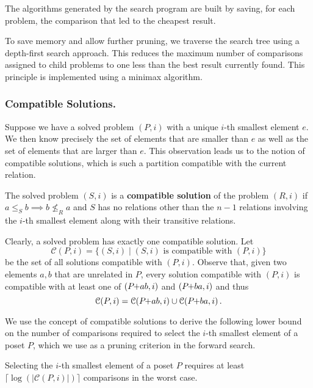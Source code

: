 \documentclass[a4paper,UKenglish,cleveref, autoref, thm-restate]{lipics-v2021}
\newcommand{\pchild}[3]{{#1}\kern-1pt{+}{#2}{#3}}
\begin{document}
The algorithms generated by the search program are built by saving, for each problem, the comparison that led to the cheapest result.

To save memory and allow further pruning, we traverse the search tree using a depth-first search approach.
This reduces the maximum number of comparisons assigned to child problems to one less than the best result currently found.
This principle is implemented using a minimax algorithm.

\subsubsection{Compatible Solutions.}
Suppose we have a solved problem $(P, i)$ with a unique $i$-th smallest element $e$.
We then know precisely the set of elements that are smaller than $e$ as well as the set of elements that are larger than $e$.
This observation leads us to the notion of compatible solutions, which is such a partition compatible with the current relation.

\begin{definition}
  The solved problem $(S, i)$ is a \textbf{compatible solution} of the problem $(R, i)$ if $a \le_S b \implies b \not\le_R a$ and $S$ has no relations other than the $n - 1$ relations involving the $i$-th smallest element along with their transitive relations.
\end{definition}

Clearly, a solved problem has exactly one compatible solution.
Let
\begin{equation*}
  \mathcal{C}(P, i) = \{(S, i) \mid (S, i) \text{ is compatible with } (P, i)\}
\end{equation*}
be the set of all solutions compatible with $(P, i)$.
Observe that, given two elements $a,b$ that are unrelated in $P$, every solution compatible with $(P, i)$ is compatible with at least one of $(\pchild{P}{a}{b}, i)$ and $(\pchild{P}{b}{a}, i)$ and thus
\begin{equation}\label{lemma:compatible_union}
  \mathcal{C}(P, i) = \mathcal{C}(\pchild{P}{a}{b}, i) \cup \mathcal{C}(\pchild{P}{b}{a}, i)\,\text{.}
\end{equation}

We use the concept of compatible solutions to derive the following lower bound on the number of comparisons required to select the $i$-th smallest element of a poset $P$, which we use as a pruning criterion in the forward search.

\begin{theorem}\label{theorem:compatible_log}
  Selecting the $i$-th smallest element of a poset $P$ requires at least $\lceil\log(|\mathcal{C}(P, i)|)\rceil$ comparisons in the worst case.
\end{theorem}
\end{document}
